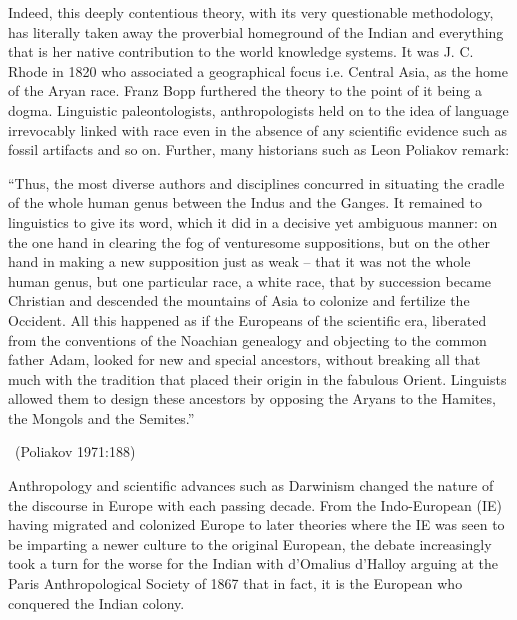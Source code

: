 Indeed, this deeply contentious theory, with its very questionable methodology, has literally taken away the proverbial homeground of the Indian and everything that is her native contribution to the world knowledge systems. It was J. C. Rhode in 1820 who associated a geographical focus i.e. Central Asia, as the home of the Aryan race. Franz Bopp furthered the theory to the point of it being a dogma. Linguistic paleontologists, anthropologists held on to the idea of language irrevocably linked with race even in the absence of any scientific evidence such as fossil artifacts and so on. Further, many historians such as Leon Poliakov remark:

\begin{myquote}
“Thus, the most diverse authors and disciplines concurred in situating the cradle of the whole human genus between the Indus and the Ganges. It remained to linguistics to give its word, which it did in a decisive yet ambiguous manner: on the one hand in clearing the fog of venturesome suppositions, but on the other hand in making a new supposition just as weak -- that it was not the whole human genus, but one particular race, a white race, that by succession became Christian and descended the mountains of Asia to colonize and fertilize the Occident. All this happened as if the Europeans of the scientific era, liberated from the conventions of the Noachian genealogy and objecting to the common father Adam, looked for new and special ancestors, without breaking all that much with the tradition that placed their origin in the fabulous Orient. Linguists allowed them to design these ancestors by opposing the Aryans to the Hamites, the Mongols and the Semites.”

~\hfill (Poliakov 1971:188)
\end{myquote}

Anthropology and scientific advances such as Darwinism changed the nature of the discourse in Europe with each passing decade. From the Indo-European (IE) having migrated and colonized Europe to later theories where the IE was seen to be imparting a newer culture to the original European, the debate increasingly took a turn for the worse for the Indian with d'Omalius d'Halloy arguing at the Paris Anthropological Society of 1867 that in fact, it is the European who conquered the Indian colony.

